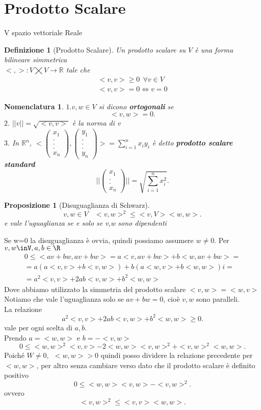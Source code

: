 \documentclass[12px]{article}
\theoremstyle{break}
\theoremstyle{break}
\theoremstyle{break}
\newtheorem{defin}{Definizione}
\theoremstyle{break}
\newtheorem{propo}{Proposizione}
\theoremstyle{break}
\newtheorem*{dimo}{Dimostrazione}
\theoremstyle{break}
\theoremstyle{breal}
\newtheorem{nomen}{Nomenclatura}
\newenvironment{dimo}
  {\begin{dimostrazione}}
  {\hfill\square\end{dimostrazione}}
\newenvironment{prop}
{\begin{mdframed}[linecolor=red, backgroundcolor=red!10]\begin{propo}}
  {\end{propo}\end{mdframed}}
\newenvironment{defi}
{\begin{mdframed}[linecolor=orange, backgroundcolor=orange!10]\begin{defin}}
  {\end{defin}\end{mdframed}}
\newenvironment{nome}
{\begin{mdframed}[linecolor=green, backgroundcolor=green!10]\begin{nomen}}
  {\end{nomen}\end{mdframed}}
\newcommand{\icol}[1]{%
  \left(\begin{smallmatrix}#1\end{smallmatrix}\right)%
}
\begin{document}
\section{Prodotto Scalare}
V spazio vettoriale Reale
\begin{defi}[Prodotto Scalare]
	Un prodotto scalare su $V$ è una forma bilineare simmetrica \\$< , >: V\bigtimes V \rightarrow \mathbb{R}$ tale che \\
	\begin{gather*}
		<v,v> \geq 0 \ \ \forall v\in V\\
		<v,v> = 0 \Leftrightarrow v=0
	\end{gather*}
\end{defi}
\begin{nome}
	$1. v,w\in V$ si dicono \textbf{ortogonali} se \[
	<v,w> = 0
	.\] 
	$2.$ $|| v || = \sqrt{<v,v>}$ è la norma di v\\
	$3.$ In $\mathbb{R}^n$, $<\icol{x_1\\.\\.\\.\\x_n},\icol{y_1\\.\\.\\.\\y_n}> = \sum^n_{i=1}x_iy_i$
	è detto \textbf{prodotto scalare standard}
	\[
		||\icol{x_1\\.\\.\\x_n}|| = \sqrt{\sum^n_{i=1}x_i^2}
	.\] 
\end{nome}
\begin{prop}[Disuguaglianza di Schwarz]
\[v,w\in V \ \ \ \ <v,w>^2 \leq <v,V><w,w>.\]
e vale l'uguaglianza se e solo se v,w sono dipendenti
\end{prop}
\newpage
\begin{dimo}
	Se w=0 la disuguaglianza è ovvia, quindi possiamo assumere $w\neq 0$. Per $v,w\inV, a,b\in\R$
	\begin{gather*}
	0\leq <av + bw, av + bw> = a<v,av + bw> + b<w,av + bw> =\\
	= a(a<v,v> + b<v,w>) + b(a<w,v> + b<w,w>)i =\\
	= a^2<v,v> + 2ab <v,w> + b^2 <w,w>
\end{gather*} 
Dove abbiamo utilizzato la simmetria del prodotto scalare $<v,w> = <w,v>$\\
Notiamo che vale l'uguaglianza solo se $av + bw = 0$, cioè $v,w$ sono paralleli.\\
La relazione
\[
a^2<v,v> + 2ab <v,w> + b^2 <w,w> \geq 0
.\] 
vale per ogni scelta di $a,b$. \\
Prendo $a = <w,w>$ e $b = -<v,w>$\\
\[
0\leq <w,w>^2<v,v>-2<w,w><v,w>^2 + <v,w>^2<w,w>
.\]
Poiché $W \neq 0, \ \ <w,w> > 0$ quindi posso dividere la relazione precedente per $< w,w>$, per altro senza cambiare verso dato che il prodotto scalare è definito positivo
\[
0\leq <w,w><v,w> - <v,w>^2
.\] 
ovvero \[
<v,w>^2 \leq <v,v><w,w>
.\] 
\end{dimo} \\
\end{document}
